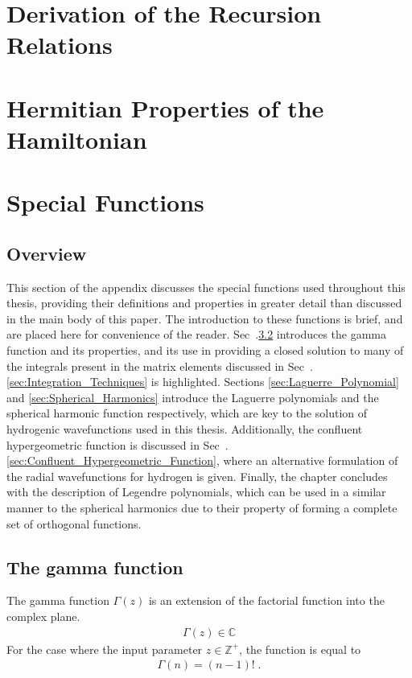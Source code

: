 \chapter{Derivation of the Recursion Relations}
\chapter{Hermitian Properties of the Hamiltonian} \label{sec:Hermitian_Left}
\chapter{Special Functions}
    \section{Overview}
        This section of the appendix discusses the special functions used throughout this thesis, providing their definitions and properties in greater detail than discussed in the main body of this paper. The introduction to these functions is brief, and are placed here for convenience of the reader. Sec~.\ref{sec:Gamma_Function} introduces the gamma function and its properties, and its use in providing a closed solution to many of the integrals present in the matrix elements discussed in Sec~.\ref{sec:Integration_Techniques} is highlighted. Sections \ref{sec:Laguerre_Polynomial} and \ref{sec:Spherical_Harmonics} introduce the Laguerre polynomials and the spherical harmonic function respectively, which are key to the solution of hydrogenic wavefunctions used in this thesis. Additionally, the confluent hypergeometric function is discussed in Sec~.\ref{sec:Confluent_Hypergeometric_Function}, where an alternative formulation of the radial wavefunctions for hydrogen is given. Finally, the chapter concludes with the description of Legendre polynomials, which can be used in a similar manner to the spherical harmonics due to their property of forming a complete set of orthogonal functions.
    \section{The gamma function} \label{sec:Gamma_Function}
        The gamma function $\Gamma(z)$ is an extension of the factorial function into the complex plane. 
        \begin{align}
            \Gamma(z) \in \mathbb{C} 
        \end{align}
        For the case where the input parameter $z \in \mathbb{Z}^+$, the function is equal to \cite{Arfken_Weber_Arfken_Weber_2008}
        \begin{align}
            \Gamma(n) = (n - 1)!\;.
        \end{align}

